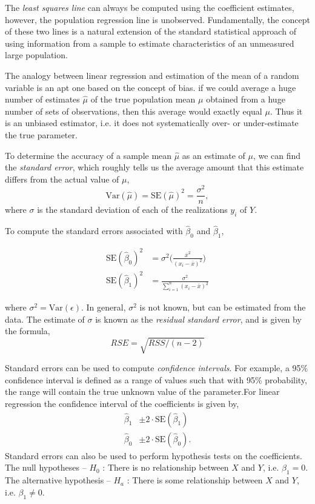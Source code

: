\documentclass{article}
\numberwithin{equation}{section}
\begin{document}
The \textit{least squares line} can always be computed using the coefficient estimates, however, the population regression line is unobserved. Fundamentally, the concept of these two lines is a natural extension of the standard statistical approach of using information from a sample to estimate characteristics of an unmeasured large population.
 
The analogy between linear regression and estimation of the mean of a
random variable is an apt one based on the concept of bias. if we could average a huge number of estimates $\hat \mu$ of the true population mean $\mu$ obtained from a huge number of sets of observations, then this average would exactly equal $\mu$. Thus it is an unbiased estimator, i.e. it does not systematically over- or under-estimate the true parameter. 

To determine the accuracy of a sample mean $\hat \mu$ as an estimate of $\mu$, we can find the \textit{standard error}, which roughly tells us the average amount that this estimate differs from the actual value of $\mu$,
\begin{equation}
    \text{Var} (\hat \mu) = \text{SE} (\hat \mu ) ^2 = \frac{\sigma^2}{n},
\end{equation}
where $\sigma$ is the standard deviation of each of the realizations $y_i$ of $Y$.

To compute the standard errors associated with $\hat \beta_0$ and $\hat \beta_1$,

\begin{align*}
    \text{SE} ( \hat \beta_0 )^2 &= \sigma^2 \Bigg (  \frac{\bar x^2}{(x_i - \bar x)^2}  \Bigg )\\ 
    \text{SE} ( \hat \beta_1 )^2 &= \frac{\sigma^2}{\sum_{i=1}^n (x_i - \bar x)^2} 
\end{align*}

where $\sigma^2 = \text{Var}(\epsilon)$. In general, $\sigma^2$ is not known, but can be estimated from the data. The estimate of $\sigma$ is known as the \textit{residual standard error}, and is given by the formula,
\begin{equation}\label{eq:RSE-1}
    RSE = \sqrt{RSS/(n - 2)}
\end{equation}

Standard errors can be used to compute \textit{confidence intervals}. For example, a  95\% confidence interval is defined as a range of values such that with  95\% probability, the range will contain the true unknown value of the parameter.For linear regression the confidence interval of the coefficients is given by,
\begin{align*}
    \hat \beta_1 &\pm 2 \cdot \text{SE}(\hat \beta_1)  \\
    \hat \beta_0 &\pm 2 \cdot \text{SE}(\hat \beta_0).
\end{align*}
Standard errors can also be used to perform hypothesis tests on the coefficients. The null hypotheses --  $H_0$ : There is no relationship between $X$ and $Y$, i.e. $\beta_1 = 0$. The alternative hypothesis -- $H_a$ : There is some relationship between $X$ and $Y$, i.e. $\beta_1 \neq 0$. 
\end{document}
